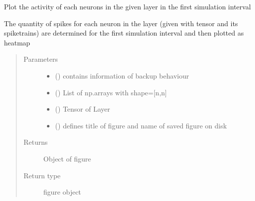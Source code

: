 \documentclass[letterpaper,10pt,english]{sphinxmanual}
\begin{document}
\begin{fulllineitems}
\label{\detokenize{SpikingConvNet:SpikingConvNet.utils.plot_spike_activity}}
Plot the activity of each neurons in the given layer in the first
simulation interval

The quantity of spikes for each neuron in the layer (given with tensor
and its spiketrains) are determined for the first simulation interval
and then plotted as heatmap
\begin{quote}\begin{description}
\item[{Parameters}] \leavevmode\begin{itemize}
\item {} 
 () \textendash{} contains information of backup behaviour

\item {} 
 () \textendash{} List of np.arrays with shape={[}n,n{]}

\item {} 
 () \textendash{} Tensor of Layer

\item {} 
 () \textendash{} defines title of figure and name of saved figure on disk

\end{itemize}

\item[{Returns}] \leavevmode
{} \textendash{} Object of figure

\item[{Return type}] \leavevmode
figure object

\end{description}\end{quote}

\end{fulllineitems}

\end{document}

